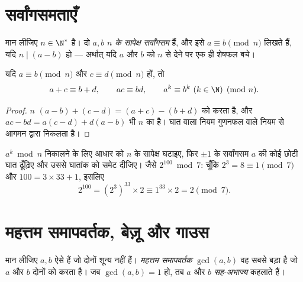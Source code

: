 \section{सर्वांगसमताएँ}

\begin{definition}[सर्वांगसमता]\label{def:g12:arith:congruence}
मान लीजिए $n \in \N^*$ है। दो  $a, b$ \emph{$n$ के सापेक्ष
सर्वांगसम} हैं, और इसे $a \equiv b \pmod n$ लिखते हैं, यदि $n \mid (a - b)$ हो ---
अर्थात् यदि $a$ और $b$ को $n$ से  देने पर एक ही शेषफल बचे।
\end{definition}

\begin{proposition}[संक्रियाओं के साथ संगति]\label{prop:g12:arith:congops}
यदि $a \equiv b \pmod n$ और $c \equiv d \pmod n$ हों, तो
\[
a + c \equiv b + d, \qquad
ac \equiv bd, \qquad
a^k \equiv b^k \ (k \in \N) \pmod n .
\]
\end{proposition}

\begin{proof}
$n$ $(a-b) + (c-d) = (a+c) - (b+d)$ को  करता है, और $ac - bd = a(c - d) + d(a - b)$ भी $n$ का  है। घात वाला नियम
गुणनफल वाले नियम से आगमन द्वारा निकलता है।
\end{proof}

\begin{method}[$n$ के सापेक्ष घातें निकालना]\label{met:g12:arith:powers}
$a^k \bmod n$ निकालने के लिए आधार को $n$ के सापेक्ष घटाइए, फिर $\pm1$ के सर्वांगसम $a$
की कोई छोटी घात ढूँढ़िए और उससे घातांक को समेट दीजिए। जैसे $2^{100} \bmod 7$: चूँकि $2^3 = 8 \equiv 1 \pmod 7$
और $100 = 3\times33 + 1$, इसलिए
\[
2^{100} = \left(2^{3}\right)^{33} \times 2 \equiv 1^{33}\times 2 = 2 \pmod 7 .
\]
\end{method}

\section{महत्तम समापवर्तक, बेज़ू और गाउस}

\begin{definition}\label{def:g12:arith:gcd}
मान लीजिए $a, b$ ऐसे  हैं जो दोनों शून्य नहीं हैं। \emph{महत्तम
समापवर्तक} $\gcd(a, b)$ वह सबसे बड़ा  है जो $a$ और
$b$ दोनों को  करता है। जब $\gcd(a,b) = 1$ हो, तब $a$ और $b$ \emph{सह-अभाज्य}
कहलाते हैं।
\end{definition}

